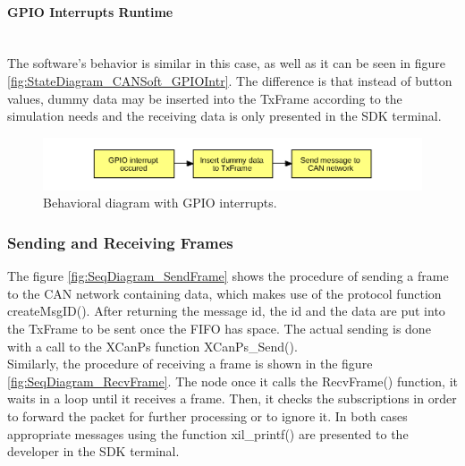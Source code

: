 \paragraph{GPIO Interrupts Runtime}~\\
The software's behavior is similar in this case, as well as it can be seen in figure \ref{fig:StateDiagram_CANSoft_GPIOIntr}.
The difference is that instead of button values, dummy data may be inserted into the TxFrame according to the simulation needs and the receiving data is only presented in the SDK terminal.
\begin{figure}[h!]
	\centering
	\includegraphics[width = 1\linewidth]{graphics/FlowChart_CANSoft_GPIOIntr.pdf}
	\caption{Behavioral diagram with GPIO interrupts.}
	\label{fig:FlowChart_CANSoft_GPIOIntr}
\end{figure}

\subsubsection{Sending and Receiving Frames}
The figure \ref{fig:SeqDiagram_SendFrame} shows the procedure of sending a frame to the CAN network containing data, which makes use of the protocol function createMsgID().
After returning the message id, the id and the data are put into the TxFrame to be sent once the FIFO has space.
The actual sending is done with a call to the XCanPs function XCanPs\_Send().
\\
Similarly, the procedure of receiving a frame is shown in the figure \ref{fig:SeqDiagram_RecvFrame}.
The node once it calls the RecvFrame() function, it waits in a loop until it receives a frame.
Then, it checks the subscriptions in order to forward the packet for further processing or to ignore it.
In both cases appropriate messages using the function xil\_printf() are presented to the developer in the SDK terminal.

